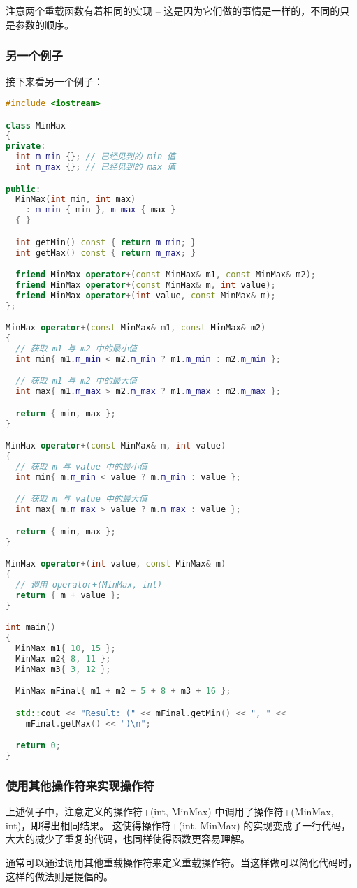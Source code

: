 \documentclass[../../LearnCpp.tex]{subfiles}
\begin{document}
注意两个重载函数有着相同的实现 -- 这是因为它们做的事情是一样的，不同的只是参数的顺序。

\subsubsection*{另一个例子}

接下来看另一个例子：

\begin{lstlisting}[language=C++]
#include <iostream>

class MinMax
{
private:
  int m_min {}; // 已经见到的 min 值
  int m_max {}; // 已经见到的 max 值

public:
  MinMax(int min, int max)
    : m_min { min }, m_max { max }
  { }

  int getMin() const { return m_min; }
  int getMax() const { return m_max; }

  friend MinMax operator+(const MinMax& m1, const MinMax& m2);
  friend MinMax operator+(const MinMax& m, int value);
  friend MinMax operator+(int value, const MinMax& m);
};

MinMax operator+(const MinMax& m1, const MinMax& m2)
{
  // 获取 m1 与 m2 中的最小值
  int min{ m1.m_min < m2.m_min ? m1.m_min : m2.m_min };

  // 获取 m1 与 m2 中的最大值
  int max{ m1.m_max > m2.m_max ? m1.m_max : m2.m_max };

  return { min, max };
}

MinMax operator+(const MinMax& m, int value)
{
  // 获取 m 与 value 中的最小值
  int min{ m.m_min < value ? m.m_min : value };

  // 获取 m 与 value 中的最大值
  int max{ m.m_max > value ? m.m_max : value };

  return { min, max };
}

MinMax operator+(int value, const MinMax& m)
{
  // 调用 operator+(MinMax, int)
  return { m + value };
}

int main()
{
  MinMax m1{ 10, 15 };
  MinMax m2{ 8, 11 };
  MinMax m3{ 3, 12 };

  MinMax mFinal{ m1 + m2 + 5 + 8 + m3 + 16 };

  std::cout << "Result: (" << mFinal.getMin() << ", " <<
    mFinal.getMax() << ")\n";

  return 0;
}
\end{lstlisting}

\subsubsection*{使用其他操作符来实现操作符}

上述例子中，注意定义的操作符+(int, MinMax) 中调用了操作符+(MinMax, int)，即得出相同结果。
这使得操作符+(int, MinMax) 的实现变成了一行代码，大大的减少了重复的代码，也同样使得函数更容易理解。

通常可以通过调用其他重载操作符来定义重载操作符。当这样做可以简化代码时，这样的做法则是提倡的。
\end{document}
